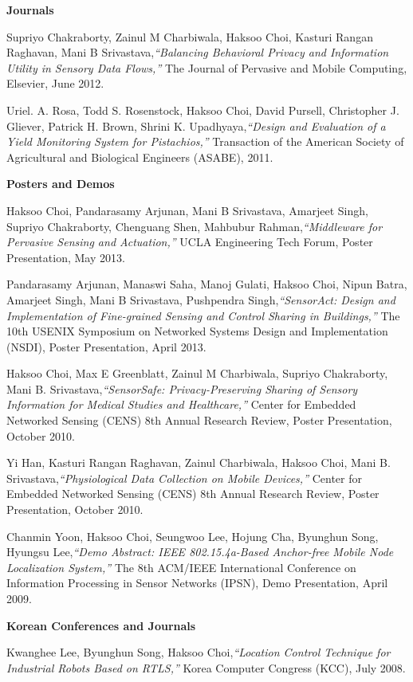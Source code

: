 \documentclass[12pt,letterpaper]{article}
\begin{document}
\bigskip
\textbf{Journals}

\medskip
Supriyo Chakraborty, Zainul M Charbiwala, Haksoo Choi, Kasturi Rangan Raghavan, Mani B Srivastava,\emph{``Balancing Behavioral Privacy and Information Utility in Sensory Data Flows,''} The Journal of Pervasive and Mobile Computing, Elsevier, June 2012.

\bigskip
Uriel. A. Rosa, Todd S. Rosenstock, Haksoo Choi, David Pursell, Christopher J. Gliever, Patrick H. Brown, Shrini K. Upadhyaya,\emph{``Design and Evaluation of a Yield Monitoring System for Pistachios,''} Transaction of the American Society of Agricultural and Biological Engineers (ASABE), 2011.

\bigskip
\textbf{Posters and Demos}

\medskip
Haksoo Choi, Pandarasamy Arjunan, Mani B Srivastava, Amarjeet Singh, Supriyo Chakraborty, Chenguang Shen, Mahbubur Rahman,\emph{``Middleware for Pervasive Sensing and Actuation,''} UCLA Engineering Tech Forum, Poster Presentation, May 2013.

\bigskip
Pandarasamy Arjunan, Manaswi Saha, Manoj Gulati, Haksoo Choi, Nipun Batra, Amarjeet Singh, Mani B Srivastava, Pushpendra Singh,\emph{``SensorAct: Design and Implementation of Fine-grained Sensing and Control Sharing in Buildings,''} The 10th USENIX Symposium on Networked Systems Design and Implementation (NSDI), Poster Presentation, April 2013.

\bigskip
Haksoo Choi, Max E Greenblatt, Zainul M Charbiwala, Supriyo Chakraborty, Mani B. Srivastava,\emph{``SensorSafe: Privacy-Preserving Sharing of Sensory Information for Medical Studies and Healthcare,''} Center for Embedded Networked Sensing (CENS) 8th Annual Research Review, Poster Presentation, October 2010.

\bigskip
Yi Han, Kasturi Rangan Raghavan, Zainul Charbiwala, Haksoo Choi, Mani B. Srivastava,\emph{``Physiological Data Collection on Mobile Devices,''} Center for Embedded Networked Sensing (CENS) 8th Annual Research Review, Poster Presentation, October 2010.

\bigskip
Chanmin Yoon, Haksoo Choi, Seungwoo Lee, Hojung Cha, Byunghun Song, Hyungsu Lee,\emph{``Demo Abstract: IEEE 802.15.4a-Based Anchor-free Mobile Node Localization System,''} The 8th ACM/IEEE International Conference on Information Processing in Sensor Networks (IPSN), Demo Presentation, April 2009.

\bigskip
\textbf{Korean Conferences and Journals}

\medskip
Kwanghee Lee, Byunghun Song, Haksoo Choi,\emph{``Location Control Technique for Industrial Robots Based on RTLS,''} Korea Computer Congress (KCC), July 2008.
\end{document}

